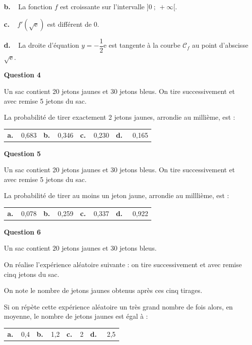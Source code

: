 \textbf{b.~~}La fonction $f$ est croissante sur l'intervalle $]0~;~+ \infty[$.

\textbf{c.~~}$f'\left(\sqrt{\text{e}} \right)$ est différent de $0$.

\textbf{d.~~}La droite d'équation $y = - \dfrac12 \text{e}$ est tangente à la courbe $\mathcal{C}_f$ au point d'abscisse $\sqrt{\text{e}}$.

\medskip

\textbf{Question 4}

\medskip

Un sac contient 20 jetons jaunes et 30 jetons bleus. On tire successivement et avec remise 5 jetons du sac.

La probabilité de tirer exactement 2 jetons jaunes, arrondie au millième, est :

\begin{center}
\begin{tabularx}{\linewidth}{*{4}{X}}
\textbf{a.~~}0,683&\textbf{b.~~}0,346 &\textbf{c.~~}0,230&\textbf{d.~~} 0,165
\end{tabularx}
\end{center}

\medskip

\textbf{Question 5}

\medskip

Un sac contient 20 jetons jaunes et 30 jetons bleus. On tire successivement et avec remise 5 jetons du sac.

La probabilité de tirer au moins un jeton jaune, arrondie au milllième, est :

\begin{center}
\begin{tabularx}{\linewidth}{*{4}{X}}
\textbf{a.~~}0,078&\textbf{b.~~}0,259 &\textbf{c.~~}0,337&\textbf{d.~~} 0,922
\end{tabularx}
\end{center}

\medskip

\textbf{Question 6}

\medskip

Un sac contient $20$ jetons jaunes et $30$ jetons bleus.

On réalise l'expérience aléatoire suivante : on tire successivement et avec remise cinq jetons du sac. 

On note le nombre de jetons jaunes obtenus après ces cinq tirages. 

Si on répète cette expérience aléatoire un très grand nombre de fois alors, en moyenne, le nombre de jetons jaunes est égal à :

\begin{center}
\begin{tabularx}{\linewidth}{*{4}{X}}
\textbf{a.~~}0,4&\textbf{b.~~}1,2 &\textbf{c.~~}2&\textbf{d.~~} 2,5
\end{tabularx}
\end{center}
